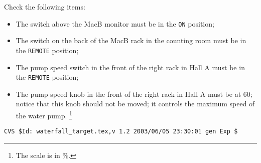 Check the following items:
\begin{itemize}
 \item The switch above the MacB monitor must be in the \verb.ON. position; 
 \item The switch on the back of the MacB rack in the counting room must be in 
	the \verb.REMOTE. position;
 \item The pump speed switch in the front of the right rack in
 	Hall A must be in the \verb.REMOTE. position;
 \item The pump speed knob in the front of the right rack in Hall
 	A must be at 60; notice that this knob should not be
 	moved; it controls the maximum speed of the water pump.
	 \footnote{The scale is in \%.} 
\end{itemize}
%
%
{\small
\begin{verbatim}CVS $Id: waterfall_target.tex,v 1.2 2003/06/05 23:30:01 gen Exp $\end{verbatim}
}
